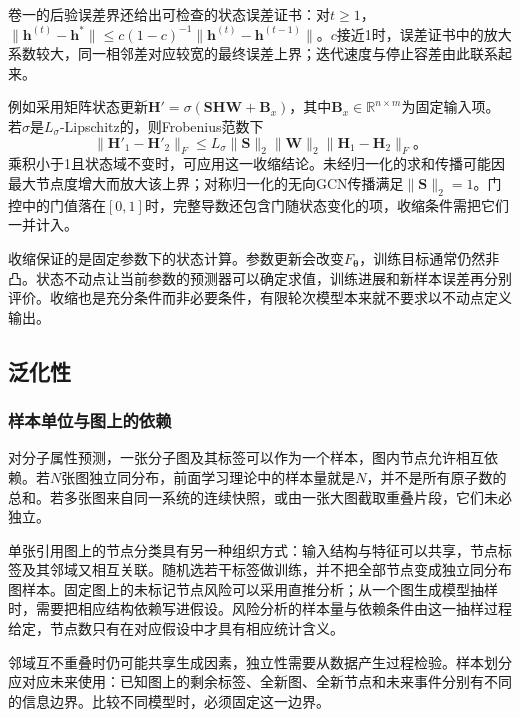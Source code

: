 卷一的后验误差界还给出可检查的状态误差证书：对$t\geq1$，$\lVert\bm{h}^{(t)}-\bm{h}^*\rVert\leq c(1-c)^{-1}\lVert\bm{h}^{(t)}-\bm{h}^{(t-1)}\rVert$。$c$接近1时，误差证书中的放大系数较大，同一相邻差对应较宽的最终误差上界；迭代速度与停止容差由此联系起来。

例如采用矩阵状态更新$\bm{H}'=\sigma(\bm{S}\bm{H}\bm{W}+\bm{B}_x)$，其中$\bm{B}_x\in\mathbb{R}^{n\times m}$为固定输入项。若$\sigma$是$L_\sigma$-Lipschitz的，则Frobenius范数下
\begin{equation}
  \lVert\bm{H}'_1-\bm{H}'_2\rVert_F
    \leq L_\sigma\lVert\bm{S}\rVert_2\lVert\bm{W}\rVert_2
      \lVert\bm{H}_1-\bm{H}_2\rVert_F\text{。}
  \label{eq:gnn-state-lipschitz}
\end{equation}
乘积小于1且状态域不变时，可应用这一收缩结论。未经归一化的求和传播可能因最大节点度增大而放大该上界；对称归一化的无向GCN传播满足$\lVert\bm{S}\rVert_2=1$。门控中的门值落在$[0,1]$时，完整导数还包含门随状态变化的项，收缩条件需把它们一并计入。

收缩保证的是固定参数下的状态计算。参数更新会改变$F_{\bm{\theta}}$，训练目标通常仍然非凸。状态不动点让当前参数的预测器可以确定求值，训练进展和新样本误差再分别评价。收缩也是充分条件而非必要条件，有限轮次模型本来就不要求以不动点定义输出。

\subsection{泛化性}
\label{sec:gnn-generalization}

\subsubsection{样本单位与图上的依赖}
\label{sec:gnn-sample-units}

对分子属性预测，一张分子图及其标签可以作为一个样本，图内节点允许相互依赖。若$N$张图独立同分布，前面学习理论中的样本量就是$N$，并不是所有原子数的总和。若多张图来自同一系统的连续快照，或由一张大图截取重叠片段，它们未必独立。

单张引用图上的节点分类具有另一种组织方式：输入结构与特征可以共享，节点标签及其邻域又相互关联。随机选若干标签做训练，并不把全部节点变成独立同分布图样本。固定图上的未标记节点风险可以采用直推分析；从一个图生成模型抽样时，需要把相应结构依赖写进假设。风险分析的样本量与依赖条件由这一抽样过程给定，节点数只有在对应假设中才具有相应统计含义。

邻域互不重叠时仍可能共享生成因素，独立性需要从数据产生过程检验。样本划分应对应未来使用：已知图上的剩余标签、全新图、全新节点和未来事件分别有不同的信息边界。比较不同模型时，必须固定这一边界。

